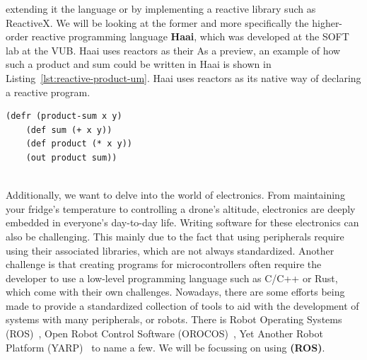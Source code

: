 \documentclass[a4paper]{book}
\begin{document}
extending it the language or by implementing a reactive library such as ReactiveX.
We will be looking at the former and more specifically the higher-order reactive
programming language \textbf{Haai}, which was developed at the SOFT lab at the VUB.
Haai uses reactors as their
As a preview, an example of how such a product and sum could be written in Haai is shown
in Listing~\ref{lst:reactive-product-um}. Haai uses reactors as its native way
of declaring a reactive program.
\begin{listing}[htbp]
	\begin{lstlisting}[language=haai]
(defr (product-sum x y)
    (def sum (+ x y))
    (def product (* x y))
    (out product sum))
    \end{lstlisting}
	\caption{Product sum in Haai}
	\label{lst:reactive-product-um}
\end{listing}\\
Additionally, we want to delve into the world of electronics.
From maintaining your fridge's temperature to controlling a drone's
altitude, electronics are deeply embedded in everyone's day-to-day life. Writing
software for these electronics can also be challenging. This mainly due to the fact that
using peripherals require using their associated libraries, which are not always
standardized. Another challenge is that creating programs for microcontrollers
often require the developer to use a low-level programming language such as C/C++ or
Rust, which come with their own challenges. Nowadays, there are some efforts
being made to provide a standardized collection of tools to aid with the development of
systems with many peripherals, or robots. There is Robot Operating Systems
(ROS)~\cite{allaban2021developing}, Open Robot Control Software (OROCOS)~\cite{bruyninckx2001open}, Yet Another Robot
Platform (YARP)~\cite{metta2006yarp} to name a few.
We will be focussing on using \textbf{(ROS)}.
\end{document}
